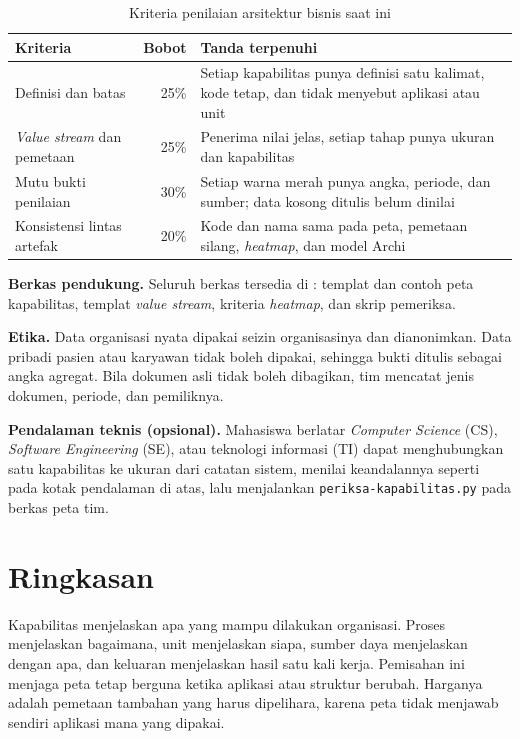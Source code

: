 \begin{table}[!htb]
  \centering
  \caption{Kriteria penilaian arsitektur bisnis saat ini}
  \label{tab:ch05-kriteria}
  \small
  \begin{tabularx}{\textwidth}{>{\raggedright\arraybackslash}p{3.8cm}rX}
    \hline
    \textbf{Kriteria} & \textbf{Bobot} & \textbf{Tanda terpenuhi} \\
    \hline
    Definisi dan batas & 25\% & Setiap kapabilitas punya definisi satu kalimat, kode tetap, dan tidak menyebut aplikasi atau unit \\
    \hline
    \textit{Value stream} dan pemetaan & 25\% & Penerima nilai jelas, setiap tahap punya ukuran dan kapabilitas \\
    \hline
    Mutu bukti penilaian & 30\% & Setiap warna merah punya angka, periode, dan sumber; data kosong ditulis belum dinilai \\
    \hline
    Konsistensi lintas artefak & 20\% & Kode dan nama sama pada peta, pemetaan silang, \textit{heatmap}, dan model Archi \\
    \hline
  \end{tabularx}
\end{table}

\textbf{Berkas pendukung.} Seluruh berkas tersedia di : templat dan contoh peta kapabilitas,
templat \textit{value stream}, kriteria \textit{heatmap}, dan skrip pemeriksa.

\textbf{Etika.} Data organisasi nyata dipakai seizin organisasinya dan dianonimkan. Data pribadi pasien atau karyawan tidak
boleh dipakai, sehingga bukti ditulis sebagai angka agregat. Bila dokumen asli tidak boleh dibagikan, tim mencatat jenis
dokumen, periode, dan pemiliknya.

\textbf{Pendalaman teknis (opsional).} Mahasiswa berlatar \textit{Computer Science} (CS), \textit{Software Engineering}
(SE), atau teknologi informasi (TI) dapat menghubungkan satu kapabilitas ke ukuran dari catatan sistem, menilai keandalannya
seperti pada kotak pendalaman di atas, lalu menjalankan \texttt{periksa-kapabilitas.py} pada berkas peta tim.

\section{Ringkasan}

Kapabilitas menjelaskan apa yang mampu dilakukan organisasi. Proses menjelaskan bagaimana, unit menjelaskan siapa, sumber daya
menjelaskan dengan apa, dan keluaran menjelaskan hasil satu kali kerja. Pemisahan ini menjaga peta tetap berguna ketika aplikasi
atau struktur berubah. Harganya adalah pemetaan tambahan yang harus dipelihara, karena peta tidak menjawab sendiri aplikasi mana
yang dipakai.

